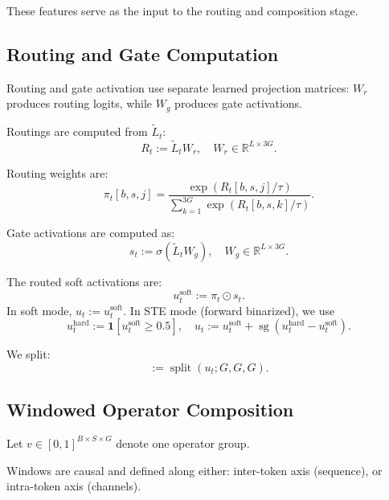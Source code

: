 \documentclass[10pt,twocolumn,letterpaper]{article}
\begin{document}
These features serve as the input to the routing and composition stage.

\subsection{Routing and Gate Computation}

Routing and gate activation use separate learned projection matrices: $W_r$
produces routing logits, while $W_g$ produces gate activations.

Routings are computed from $\tilde{L}_t$:
\begin{equation}
R_t := \tilde{L}_t W_r, \quad W_r \in \mathbb{R}^{L \times 3G}.
\end{equation}

Routing weights are:
\begin{equation}
\pi_t[b,s,j] = \frac{\exp(R_t[b,s,j]/\tau)}{\sum_{k=1}^{3G} \exp(R_t[b,s,k]/\tau)}.
\end{equation}

Gate activations are computed as:
\begin{equation}
s_t := \sigma(\tilde{L}_t W_g), \quad W_g \in \mathbb{R}^{L \times 3G}.
\end{equation}

The routed soft activations are:
\begin{equation}
u_t^{\mathrm{soft}} := \pi_t \odot s_t.
\end{equation}
In soft mode, $u_t := u_t^{\mathrm{soft}}$. In STE mode (forward binarized), we use
\begin{equation}
u_t^{\mathrm{hard}} := \mathbf{1}[u_t^{\mathrm{soft}} \ge 0.5], \quad
u_t := u_t^{\mathrm{soft}} + \operatorname{sg}(u_t^{\mathrm{hard}} - u_t^{\mathrm{soft}}).
\end{equation}

We split:
\begin{equation}
[u_t^{\text{AND}}, u_t^{\text{OR}}, u_t^{\text{NOT}}] := \operatorname{split}(u_t; G, G, G).
\end{equation}

\subsection{Windowed Operator Composition}

Let $v \in [0,1]^{B \times S \times G}$ denote one operator group.

Windows are causal and defined along either:
inter-token axis (sequence), or intra-token axis (channels).
\end{document}
